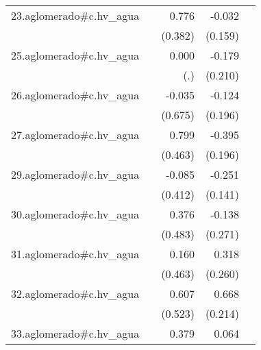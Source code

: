 {\begin{longtable}{l*{4}{D{.}{.}{-1}}}
\addlinespace
23.aglomerado#c.hv\_agua&                     &       0.776\sym{*}  &      -0.032         &                     \\
            &                     &     (0.382)         &     (0.159)         &                     \\
\addlinespace
25.aglomerado#c.hv\_agua&                     &       0.000         &      -0.179         &                     \\
            &                     &         (.)         &     (0.210)         &                     \\
\addlinespace
26.aglomerado#c.hv\_agua&                     &      -0.035         &      -0.124         &                     \\
            &                     &     (0.675)         &     (0.196)         &                     \\
\addlinespace
27.aglomerado#c.hv\_agua&                     &       0.799         &      -0.395\sym{*}  &                     \\
            &                     &     (0.463)         &     (0.196)         &                     \\
\addlinespace
29.aglomerado#c.hv\_agua&                     &      -0.085         &      -0.251         &                     \\
            &                     &     (0.412)         &     (0.141)         &                     \\
\addlinespace
30.aglomerado#c.hv\_agua&                     &       0.376         &      -0.138         &                     \\
            &                     &     (0.483)         &     (0.271)         &                     \\
\addlinespace
31.aglomerado#c.hv\_agua&                     &       0.160         &       0.318         &                     \\
            &                     &     (0.463)         &     (0.260)         &                     \\
\addlinespace
32.aglomerado#c.hv\_agua&                     &       0.607         &       0.668\sym{**} &                     \\
            &                     &     (0.523)         &     (0.214)         &                     \\
\addlinespace
33.aglomerado#c.hv\_agua&                     &       0.379         &       0.064         &                     \\

\end{longtable}}

